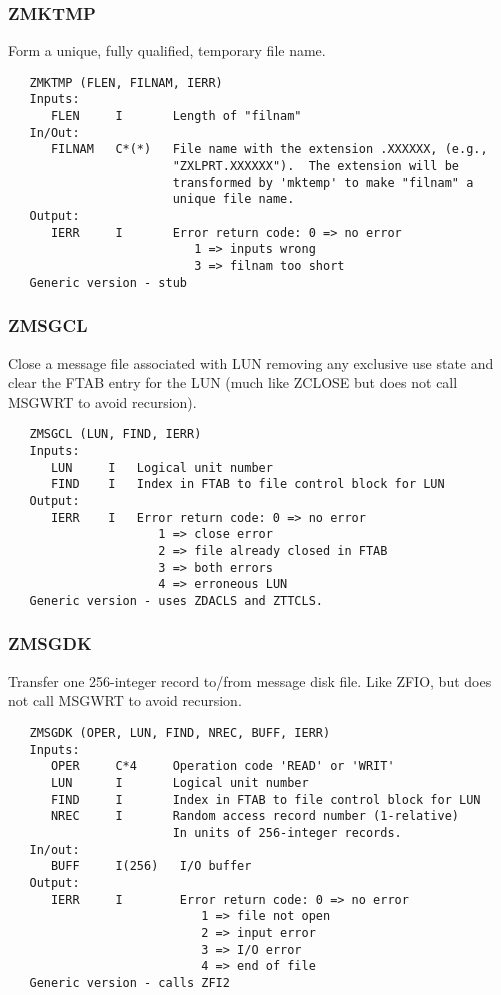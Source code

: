 \subsubsection{ZMKTMP}
Form a unique, fully qualified, temporary file name.
\begin{verbatim}
   ZMKTMP (FLEN, FILNAM, IERR)
   Inputs:
      FLEN     I       Length of "filnam"
   In/Out:
      FILNAM   C*(*)   File name with the extension .XXXXXX, (e.g.,
                       "ZXLPRT.XXXXXX").  The extension will be
                       transformed by 'mktemp' to make "filnam" a
                       unique file name.
   Output:
      IERR     I       Error return code: 0 => no error
                          1 => inputs wrong
                          3 => filnam too short
   Generic version - stub
\end{verbatim}

\subsubsection{ZMSGCL}
Close a message file associated with LUN removing any exclusive use
state and clear the FTAB entry for the LUN (much like ZCLOSE but
does not call MSGWRT to avoid recursion).
\begin{verbatim}
   ZMSGCL (LUN, FIND, IERR)
   Inputs:
      LUN     I   Logical unit number
      FIND    I   Index in FTAB to file control block for LUN
   Output:
      IERR    I   Error return code: 0 => no error
                     1 => close error
                     2 => file already closed in FTAB
                     3 => both errors
                     4 => erroneous LUN
   Generic version - uses ZDACLS and ZTTCLS.
\end{verbatim}

\subsubsection{ZMSGDK}
Transfer one 256-integer record to/from message disk file.  Like
ZFIO, but does not call MSGWRT to avoid recursion.
\begin{verbatim}
   ZMSGDK (OPER, LUN, FIND, NREC, BUFF, IERR)
   Inputs:
      OPER     C*4     Operation code 'READ' or 'WRIT'
      LUN      I       Logical unit number
      FIND     I       Index in FTAB to file control block for LUN
      NREC     I       Random access record number (1-relative)
                       In units of 256-integer records.
   In/out:
      BUFF     I(256)   I/O buffer
   Output:
      IERR     I        Error return code: 0 => no error
                           1 => file not open
                           2 => input error
                           3 => I/O error
                           4 => end of file
   Generic version - calls ZFI2
\end{verbatim}

